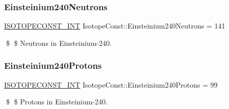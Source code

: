 \subsubsection{\texorpdfstring{Einsteinium240\+Neutrons}{Einsteinium240Neutrons}}
{\footnotesize\ttfamily \mbox{\hyperlink{group___isotope_const-_macros_ga5f18360b3e99483a35c32d789e62621c}{I\+S\+O\+T\+O\+P\+E\+C\+O\+N\+S\+T\+\_\+\+I\+NT}} Isotope\+Const\+::\+Einsteinium240\+Neutrons = 141}

\$ \$ Neutrons in Einsteinium-\/240. \mbox{\label{group___isotope_const-_einsteinium-_es240_ga73a4fc0e6036be33ffa2ff0b5e6e7d86}} 
\subsubsection{\texorpdfstring{Einsteinium240\+Protons}{Einsteinium240Protons}}
{\footnotesize\ttfamily \mbox{\hyperlink{group___isotope_const-_macros_ga5f18360b3e99483a35c32d789e62621c}{I\+S\+O\+T\+O\+P\+E\+C\+O\+N\+S\+T\+\_\+\+I\+NT}} Isotope\+Const\+::\+Einsteinium240\+Protons = 99}

\$ \$ Protons in Einsteinium-\/240. 